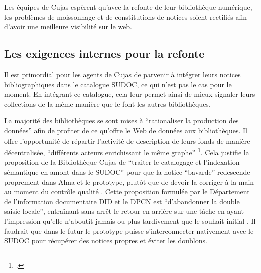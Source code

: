 Les équipes de Cujas espèrent qu'avec la refonte de leur bibliothèque numérique, les problèmes de moissonnage et de constitutions de notices soient rectifiés afin d'avoir une meilleure visibilité sur le web. 

\subsection{Les exigences internes pour la refonte}
Il est primordial pour les agents de Cujas de parvenir à intégrer leurs notices bibliographiques dans le catalogue \ac{SUDOC}, ce qui n'est pas le cas pour le moment. En intégrant ce catalogue, cela leur permet ainsi de mieux signaler leurs collections de la même manière que le font les autres bibliothèques. 

La majorité des bibliothèques se sont mises à \enquote{rationaliser la production des données} afin de profiter de ce qu'offre le Web de données aux bibliothèques. Il offre l'opportunité de répartir l'activité de description de leurs fonds de manière décentralisée, \enquote{différents acteurs enrichissant le même graphe} \footcite{bermesWebSemantiqueBibliotheque2013}. Cela justifie la proposition de la Bibliothèque Cujas de \enquote{traiter le catalogage et l'indexation sémantique en amont dans  le \ac{SUDOC}} pour que la notice \enquote{bavarde} redescende proprement dans Alma et le prototype, plutôt que de devoir la corriger à la main au moment du contrôle qualité . Cette proposition formulée par le Département de l'information documentaire \ac{DID} et le \ac{DPCN} est \enquote{d'abandonner la double saisie locale}, entraînant sans arrêt le retour en arrière sur une tâche en ayant l'impression qu'elle n'aboutit jamais ou plus tardivement que le souhait initial . Il faudrait que dans le futur le prototype puisse s'interconnecter nativement avec le \ac{SUDOC} pour récupérer des notices propres et éviter les doublons. 

